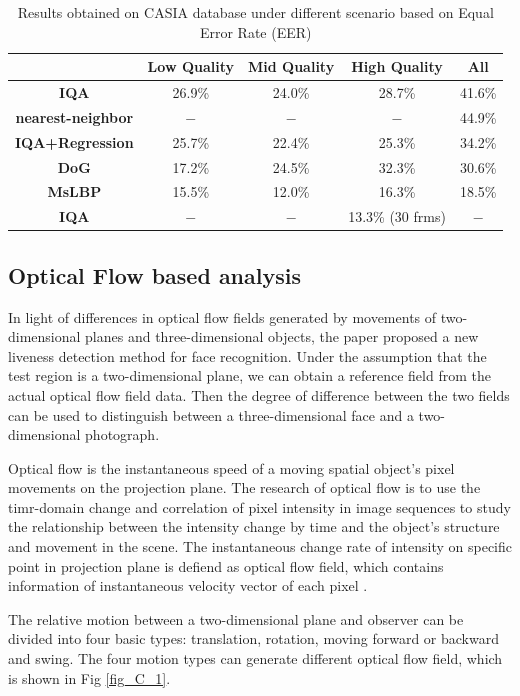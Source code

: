 \documentclass[journal]{IEEEtran}
\begin{document}
\begin{table}[!htbp]
\centering
\caption{Results obtained on CASIA database under different scenario based on Equal Error Rate (EER)}
\label{tab.b.2.result}
\begin{tabular}{ccccc}
\toprule
& Low Quality & Mid Quality & High Quality & All \\
\midrule
\textbf{IQA} & 26.9\% & 24.0\% & 28.7\% & 41.6\%\\
\textbf{nearest-neighbor} & $-$ & $-$ & $-$ & 44.9\% \\
\textbf{IQA+Regression} & 25.7\% & 22.4\% & 25.3\% & 34.2\% \\
\midrule
\textbf{DoG} & 17.2\% & 24.5\% & 32.3\% & 30.6\% \\
\textbf{MsLBP} & 15.5\% & 12.0\% & 16.3\% & 18.5\% \\
\textbf{IQA} & $−$ & $−$ & 13.3\% (30 frms) & $−$ \\
\bottomrule
\end{tabular}
\end{table}

\subsection{Optical Flow based analysis}

In light of differences in optical flow fields generated by movements of two-dimensional planes and three-dimensional objects, the paper \cite{Bao2009A} proposed a new liveness detection method for face recognition. Under the assumption that the test region is a two-dimensional plane, we can obtain a reference field from the actual optical flow field data. Then the degree of difference between the two fields can be used to distinguish between a three-dimensional face and a two-dimensional photograph.

Optical flow is the instantaneous speed of a moving spatial object's pixel movements on the projection plane. The research of optical flow is to use the timr-domain change and correlation of pixel intensity in image sequences to study the relationship between the intensity change by time and the object's structure and movement in the scene. The instantaneous change rate of intensity on specific point in projection plane is defiend as optical flow field, which contains information of instantaneous velocity vector of each pixel \cite{Barron1994Performance}.

The relative motion between a two-dimensional plane and observer can be divided into four basic types: translation, rotation, moving forward or backward and swing. The four motion types can generate different optical flow field, which is shown in Fig \ref{fig_C_1}.
\end{document}
